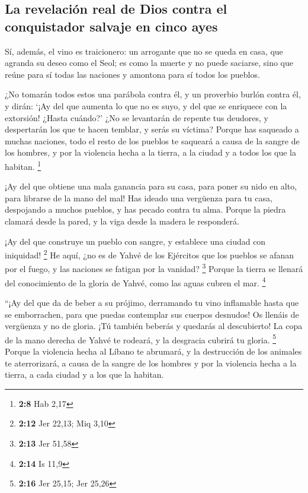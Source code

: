 \hypertarget{la-revelaciuxf3n-real-de-dios-contra-el-conquistador-salvaje-en-cinco-ayes}{%
\subsection{La revelación real de Dios contra el conquistador salvaje en
cinco
ayes}\label{la-revelaciuxf3n-real-de-dios-contra-el-conquistador-salvaje-en-cinco-ayes}}

 Sí, además, el vino es traicionero: un arrogante que no
se queda en casa, que agranda su deseo como el Seol; es como la muerte y
no puede saciarse, sino que reúne para sí todas las naciones y amontona
para sí todos los pueblos.

 ¿No tomarán todos estos una parábola contra él, y un
proverbio burlón contra él, y dirán: `¡Ay del que aumenta lo que no es
suyo, y del que se enriquece con la extorsión! ¿Hasta cuándo?'
 ¿No se levantarán de repente tus deudores, y despertarán
los que te hacen temblar, y serás su víctima?  Porque has
saqueado a muchas naciones, todo el resto de los pueblos te saqueará a
causa de la sangre de los hombres, y por la violencia hecha a la tierra,
a la ciudad y a todos los que la habitan. \footnote{\textbf{2:8} Hab
  2,17}

 ¡Ay del que obtiene una mala ganancia para su casa, para
poner su nido en alto, para librarse de la mano del mal! 
Has ideado una vergüenza para tu casa, despojando a muchos pueblos, y
has pecado contra tu alma.  Porque la piedra clamará
desde la pared, y la viga desde la madera le responderá.

 ¡Ay del que construye un pueblo con sangre, y establece
una ciudad con iniquidad! \footnote{\textbf{2:12} Jer 22,13; Miq 3,10}
 He aquí, ¿no es de Yahvé de los Ejércitos que los
pueblos se afanan por el fuego, y las naciones se fatigan por la
vanidad? \footnote{\textbf{2:13} Jer 51,58}  Porque la
tierra se llenará del conocimiento de la gloria de Yahvé, como las aguas
cubren el mar. \footnote{\textbf{2:14} Is 11,9}

 ``¡Ay del que da de beber a su prójimo, derramando tu
vino inflamable hasta que se emborrachen, para que puedas contemplar sus
cuerpos desnudos!  Os llenáis de vergüenza y no de
gloria. ¡Tú también beberás y quedarás al descubierto! La copa de la
mano derecha de Yahvé te rodeará, y la desgracia cubrirá tu gloria.
\footnote{\textbf{2:16} Jer 25,15; Jer 25,26}  Porque la
violencia hecha al Líbano te abrumará, y la destrucción de los animales
te aterrorizará, a causa de la sangre de los hombres y por la violencia
hecha a la tierra, a cada ciudad y a los que la habitan.

